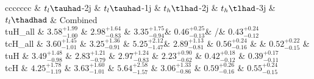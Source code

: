 
\centering
\begin{tabular}{ccccccc} \toprule\toprule
 & $t_l\tauhad$-2j & $t_l\tauhad$-1j & $t_h\tlhad$-2j  & $t_h\tlhad$-3j & $t_l\thadhad$ & Combined \\\midrule
tuH\_all & $3.58^{+1.99}_{-1.00}$ & $2.98^{+1.64}_{-0.83}$ & $3.35^{+1.75}_{-0.94}$& $0.46^{+0.25}_{-0.13}$&  /& $0.43^{+0.24}_{-0.12}$\\
tcH\_all & $3.60^{+1.45}_{-1.01}$ & $3.25^{+1.36}_{-0.91}$ & $5.25^{+2.12}_{-1.47}$& $2.89^{+1.13}_{-0.81}$ & $0.56^{+0.24}_{-0.16}$ & & $0.52^{+0.22}_{-0.15}$ &
tuH & $3.49^{+1.48}_{-0.98}$ & $2.83^{+1.21}_{-0.79}$ & $2.97^{+1.24}_{-0.83}$ & $2.23^{+0.90}_{-0.62}$ & $0.42^{+0.18}_{-0.12}$ & $0.39^{+0.17}_{-0.11}$\\
tcH & $4.25^{+1.78}_{-1.19}$ & $3.63^{+1.60}_{-1.01}$ & $5.64^{+2.58}_{-1.57}$ & $3.06^{+1.33}_{-0.86}$ & $0.59^{+0.26}_{-0.16}$ & $0.55^{+0.24}_{-0.15}$\\
\bottomrule\bottomrule\\
\end{tabular}
